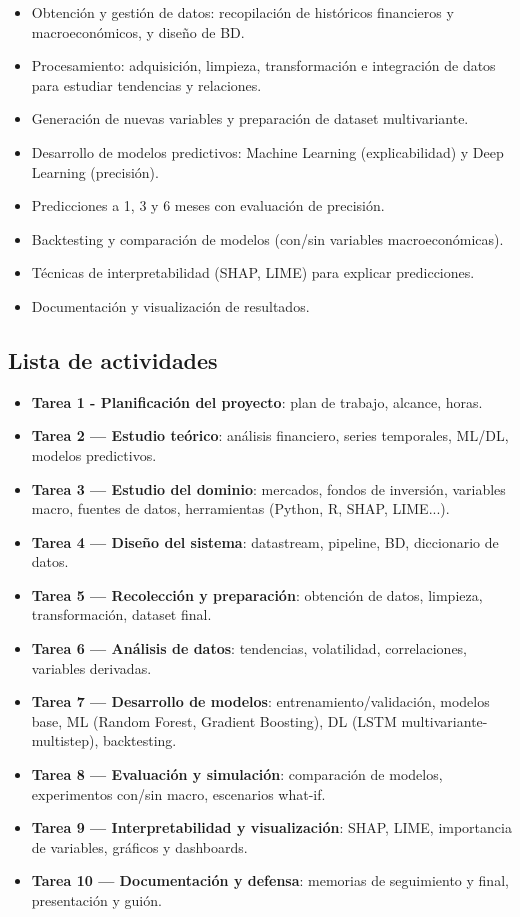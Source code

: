 \begin{itemize}
    \item Obtención y gestión de datos: recopilación de históricos financieros y macroeconómicos, y diseño de BD.
    \item Procesamiento: adquisición, limpieza, transformación e integración de datos para estudiar tendencias y relaciones.
    \item Generación de nuevas variables y preparación de dataset multivariante.
    \item Desarrollo de modelos predictivos: Machine Learning (explicabilidad) y Deep Learning (precisión).
    \item Predicciones a 1, 3 y 6 meses con evaluación de precisión.
    \item Backtesting y comparación de modelos (con/sin variables macroeconómicas).
    \item Técnicas de interpretabilidad (SHAP, LIME) para explicar predicciones.
    \item Documentación y visualización de resultados.
\end{itemize}

\subsection*{Lista de actividades}

\begin{itemize}
    \item \textbf{Tarea 1 - Planificación del proyecto}: plan de trabajo, alcance, horas.
    \item \textbf{Tarea 2 — Estudio teórico}: análisis financiero, series temporales, ML/DL, modelos predictivos.
    \item \textbf{Tarea 3 — Estudio del dominio}: mercados, fondos de inversión, variables macro, fuentes de datos, herramientas (Python, R, SHAP, LIME...).
    \item \textbf{Tarea 4 — Diseño del sistema}: datastream, pipeline, BD, diccionario de datos.
    \item \textbf{Tarea 5 — Recolección y preparación}: obtención de datos, limpieza, transformación, dataset final.
    \item \textbf{Tarea 6 — Análisis de datos}: tendencias, volatilidad, correlaciones, variables derivadas.
    \item \textbf{Tarea 7 — Desarrollo de modelos}: entrenamiento/validación, modelos base, ML (Random Forest, Gradient Boosting), DL (LSTM multivariante-multistep), backtesting.
    \item \textbf{Tarea 8 — Evaluación y simulación}: comparación de modelos, experimentos con/sin macro, escenarios what-if.
    \item \textbf{Tarea 9 — Interpretabilidad y visualización}: SHAP, LIME, importancia de variables, gráficos y dashboards.
    \item \textbf{Tarea 10 — Documentación y defensa}: memorias de seguimiento y final, presentación y guión.
\end{itemize}

